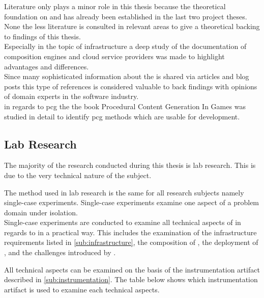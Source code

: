Literature only plays a minor role in this thesis because the theoretical
foundation on \mss{} and \ogs{} has already been established in the last two
project theses. None the less literature is consulted in relevant areas to give
a theoretical backing to findings of this thesis.\\

Especially in the topic of \ms{} infrastructure a deep study of the
documentation of composition engines and cloud service providers was made
to highlight advantages and differences.\\

Since many sophisticated information about the \mss{} is shared via articles
and blog posts this type of references is considered valuable to back findings
with opinions of domain experts in the software industry.\\

in regards to \gls{pcg} the the book Procedural Content Generation In
Games\cite{shaker2014procedural} was studied in detail to identify \gls{pcg} methods
which are usable for \og{} development.

\subsection{Lab Research}
\label{sub:lab_reserach}

The majority of the research conducted during this thesis is lab research. This
is due to the very technical nature of the subject. 

The method used in lab research is the same for all research subjects namely
single-case experiments\cite{wieringa2014design_science}. Single-case
experiments examine one aspect of a problem domain under isolation.\\

Single-case experiments are conducted to examine all technical aspects of \mss{}
in regards to \ogs{} in a practical way. This includes the examination of the
\ms{} infrastructure requirements listed in \autoref{sub:infrastructure}, the
composition of \mss{}, the deployment of \mss{}, and the challenges introduced
by \mss{}.

All technical aspects can be examined on the basis of the instrumentation
artifact described in \autoref{sub:instrumentation}. The table below shows which
instrumentation artifact is used to examine each technical aspects.

